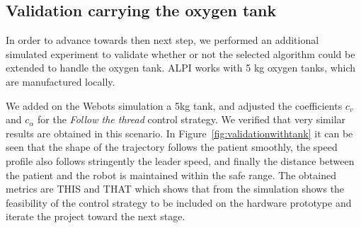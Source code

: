 \documentclass[journal]{IEEEtran}
\begin{document}
\subsection{Validation carrying the oxygen tank}

In order to advance towards then next step, we performed an additional simulated experiment to validate whether or not the selected algorithm could be extended to  handle the oxygen tank.  ALPI works with 5 kg oxygen tanks, which are manufactured locally.

We added on the Webots simulation a 5kg tank, and adjusted the coefficients $c_v$ and $c_{\alpha}$ for the  \textit{Follow the thread}  control strategy.  We verified that very similar results are obtained in this scenario.  In Figure~\ref{fig:validationwithtank} it can be seen that the shape of the trajectory follows the patient smoothly, the speed profile also follows stringently the leader speed, and finally the distance between the patient and the robot is maintained within the safe range.  The obtained metrics are THIS and THAT which shows that from the simulation shows the feasibility of the control strategy to be included on the hardware prototype and iterate the project toward the next stage.
\end{document}
